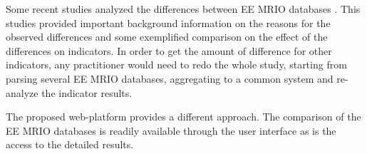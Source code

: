 Some recent studies analyzed the differences between EE MRIO databases \cite{Stadler_2014, Owen_2014, Moran_2014}. This studies provided important background information on the reasons for the observed differences and some exemplified comparison on the effect of the differences on indicators. In order to get the amount of difference for other indicators, any practitioner would need to redo the whole study, starting from parsing several EE MRIO databases, aggregating to a common system and re-analyze the indicator results. 

The proposed web-platform provides a different approach. The comparison of the EE MRIO databases is readily available through the user interface as is the access to the detailed results.